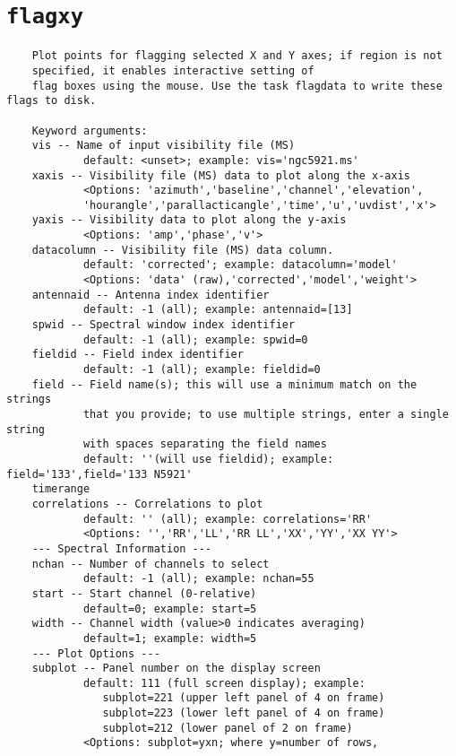 \section{{\tt flagxy}}
\label{section:tasks.flagxy}

\small
\begin{verbatim}
    Plot points for flagging selected X and Y axes; if region is not
    specified, it enables interactive setting of  
    flag boxes using the mouse. Use the task flagdata to write these flags to disk.
    
    Keyword arguments:
    vis -- Name of input visibility file (MS)
            default: <unset>; example: vis='ngc5921.ms'
    xaxis -- Visibility file (MS) data to plot along the x-axis
            <Options: 'azimuth','baseline','channel','elevation',
            'hourangle','parallacticangle','time','u','uvdist','x'>
    yaxis -- Visibility data to plot along the y-axis
            <Options: 'amp','phase','v'>
    datacolumn -- Visibility file (MS) data column.
            default: 'corrected'; example: datacolumn='model'
            <Options: 'data' (raw),'corrected','model','weight'>
    antennaid -- Antenna index identifier
            default: -1 (all); example: antennaid=[13]
    spwid -- Spectral window index identifier
            default: -1 (all); example: spwid=0
    fieldid -- Field index identifier
            default: -1 (all); example: fieldid=0
    field -- Field name(s); this will use a minimum match on the strings
            that you provide; to use multiple strings, enter a single string
            with spaces separating the field names
            default: ''(will use fieldid); example: field='133',field='133 N5921'
    timerange
    correlations -- Correlations to plot
            default: '' (all); example: correlations='RR'
            <Options: '','RR','LL','RR LL','XX','YY','XX YY'>
    --- Spectral Information ---
    nchan -- Number of channels to select
            default: -1 (all); example: nchan=55
    start -- Start channel (0-relative)
            default=0; example: start=5
    width -- Channel width (value>0 indicates averaging)
            default=1; example: width=5
    --- Plot Options ---
    subplot -- Panel number on the display screen
            default: 111 (full screen display); example:
               subplot=221 (upper left panel of 4 on frame)
               subplot=223 (lower left panel of 4 on frame)
               subplot=212 (lower panel of 2 on frame)
            <Options: subplot=yxn; where y=number of rows,

\end{verbatim}
